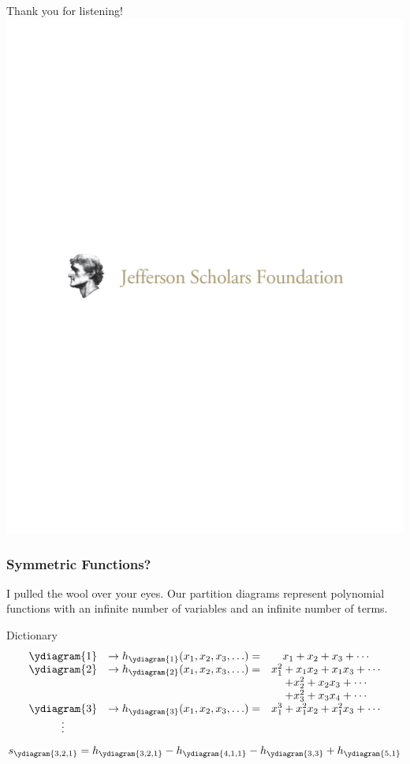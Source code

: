 \documentclass{beamer}
\begin{document}
  \begin{frame}
    \begin{center}
      Thank you for listening!\\
      \includegraphics[scale=0.5]{images/jsf_horizontal_logo.pdf}
    \end{center}
  \end{frame}
  \begin{frame}[noframenumbering]
    \frametitle{Symmetric Functions?}
    I pulled the wool over your eyes. Our partition diagrams represent
    polynomial functions with an infinite number of variables and an infinite
    number of terms.
    \begin{block}{Dictionary}
      \[
        \begin{array}{ccc}
          \ydiagram{1}&\to h_{\ydiagram{1}}(x_1,x_2,x_3,\ldots) =
          & x_1 + x_2 + x_3 + \cdots\\
          \ydiagram{2}&\to h_{\ydiagram{2}}(x_1, x_2, x_3, \ldots) =
          & x_1^2 + x_1x_2 + x_1x_3 + \cdots \\
                      &&+ x_2^2 + x_2 x_3 + \cdots\\
                      && + x_3^2 + x_3 x_4 + \cdots \\
          \ydiagram{3}& \to h_{\ydiagram{3}}(x_1, x_2, x_3, \ldots) =
          & x_1^3 + x_1^2 x_2 + x_1^2 x_3 + \cdots\\
          \vdots
        \end{array}
      \]\[
        s_{\ydiagram{3,2,1}} = h_{\ydiagram{3,2,1}} - h_{\ydiagram{4,1,1}} -
  h_{\ydiagram{3,3}} + h_{\ydiagram{5,1}}
      \]
    \end{block}

  \end{frame}
\end{document}
